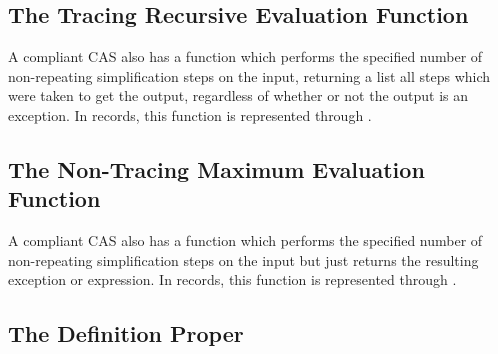 \documentclass{report}
\begin{document}
\subsection{The Tracing Recursive Evaluation Function}
A compliant CAS also has a function which performs the specified number of non-repeating simplification steps on the input, returning a list all steps which were taken to get the output, regardless of whether or not the output is an exception.  In  records, this function is represented through .

\subsection{The Non-Tracing Maximum Evaluation Function}
A compliant CAS also has a function which performs the specified number of non-repeating simplification steps on the input but just returns the resulting exception or expression.  In  records, this function is represented through .

\subsection{The Definition Proper}
\end{document}
